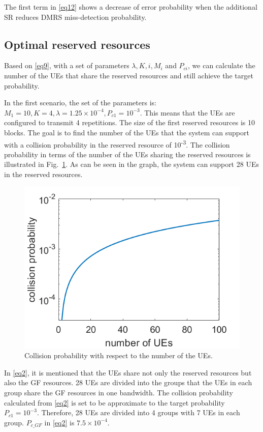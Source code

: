 \documentclass{ieeeaccess}
\begin{document}
The first term in \eqref{eq12} shows a decrease of error probability when the additional SR reduces DMRS miss-detection probability.

\subsection{Optimal reserved resources}
Based on \eqref{eq9}, with a set of parameters  $\lambda, K, i, M_{i}$ and $P_{ci}$, we can calculate the number of the UEs that share the reserved resources and still achieve the target probability.

In the first scenario, the set of the parameters is: $M_1=10, K=4, \lambda=1.25\times10^{-4}, P_{c1}=10^{-3}$. This means that the UEs are configured to transmit 4 repetitions. The size of the first reserved resources is 10 blocks. The goal is to find the number of the UEs that the system can support with a collision probability in the reserved resource of 10\textsuperscript{-3}. The collision probability in terms of the number of the UEs sharing the reserved resources is illustrated in Fig.~\ref{fig12}. As can be seen in the graph, the system can support 28 UEs in the reserved resources.

\begin{figure}[htbp]
\centerline{\includegraphics[scale=0.35]{fig12.png}}
\caption{Collision probability with respect to the number of the UEs.}
\label{fig12}

\end{figure}

In \eqref{eq2}, it is mentioned that the UEs share not only the reserved resources but also the GF resources. 28 UEs are divided into the groups that the UEs in each group share the GF resources in one bandwidth. The collision probability calculated from \eqref{eq2} is set to be approximate to the target probability $P_{c1}=10^{-3}$. Therefore, 28 UEs are divided into 4 groups with 7 UEs in each group. $P_{c\_GF}$ in \eqref{eq2} is $7.5\times10^{-4}$.
\end{document}

